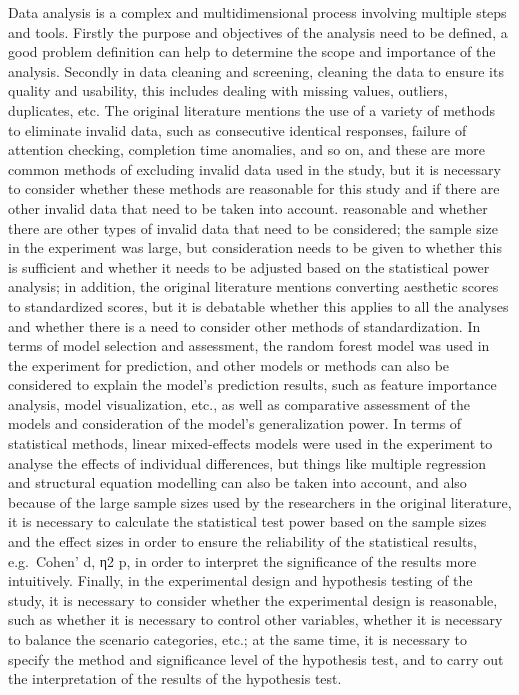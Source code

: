 \documentclass[
  man,floatsintext]{apa6}
\begin{document}
Data analysis is a complex and multidimensional process involving multiple steps and tools. Firstly the purpose and objectives of the analysis need to be defined, a good problem definition can help to determine the scope and importance of the analysis. Secondly in data cleaning and screening, cleaning the data to ensure its quality and usability, this includes dealing with missing values, outliers, duplicates, etc. The original literature mentions the use of a variety of methods to eliminate invalid data, such as consecutive identical responses, failure of attention checking, completion time anomalies, and so on, and these are more common methods of excluding invalid data used in the study, but it is necessary to consider whether these methods are reasonable for this study and if there are other invalid data that need to be taken into account. reasonable and whether there are other types of invalid data that need to be considered; the sample size in the experiment was large, but consideration needs to be given to whether this is sufficient and whether it needs to be adjusted based on the statistical power analysis; in addition, the original literature mentions converting aesthetic scores to standardized scores, but it is debatable whether this applies to all the analyses and whether there is a need to consider other methods of standardization. In terms of model selection and assessment, the random forest model was used in the experiment for prediction, and other models or methods can also be considered to explain the model's prediction results, such as feature importance analysis, model visualization, etc., as well as comparative assessment of the models and consideration of the model's generalization power. In terms of statistical methods, linear mixed-effects models were used in the experiment to analyse the effects of individual differences, but things like multiple regression and structural equation modelling can also be taken into account, and also because of the large sample sizes used by the researchers in the original literature, it is necessary to calculate the statistical test power based on the sample sizes and the effect sizes in order to ensure the reliability of the statistical results, e.g.~Cohen' d, η2 p, in order to interpret the significance of the results more intuitively. Finally, in the experimental design and hypothesis testing of the study, it is necessary to consider whether the experimental design is reasonable, such as whether it is necessary to control other variables, whether it is necessary to balance the scenario categories, etc.; at the same time, it is necessary to specify the method and significance level of the hypothesis test, and to carry out the interpretation of the results of the hypothesis test.
\end{document}
